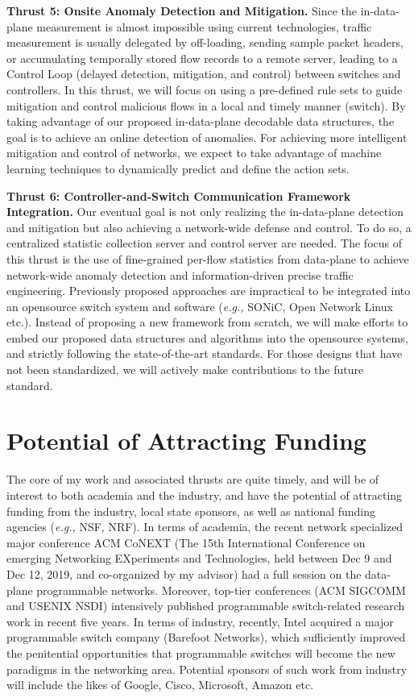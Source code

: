 \documentclass{NSF}
\newcommand{\BfPara}[1]{{\noindent\textbf{#1.}}\xspace}
\newcommand{\etc}{{etc.}\xspace}
\newcommand{\eg}{{\em e.g.,}\xspace}
\begin{document}
\BfPara{Thrust 5: Onsite Anomaly Detection and Mitigation}
Since the in-data-plane measurement is almost impossible using current technologies, traffic measurement is usually delegated by off-loading, sending sample packet headers, or accumulating temporally stored flow records to a remote server, leading to a Control Loop (delayed detection, mitigation, and control) between switches and controllers. In this thrust, we will focus on using a pre-defined rule sets to guide mitigation and control malicious flows in a local and timely manner (switch). By taking advantage of our proposed in-data-plane decodable data structures, the goal is to achieve an online detection of anomalies. For achieving more intelligent mitigation and control of networks, we expect to take advantage of machine learning techniques to dynamically predict and define the action sets.

\BfPara{Thrust 6: Controller-and-Switch Communication Framework Integration}
Our eventual goal is not only realizing the in-data-plane detection and mitigation but also achieving a network-wide defense and control. To do so, a centralized statistic collection server and control server are needed. The focus of this thrust is the use of fine-grained per-flow statistics from data-plane to achieve network-wide anomaly detection and information-driven precise traffic engineering. Previously proposed approaches are impractical to be integrated into an opensource switch system and software (\eg SONiC, Open Network Linux \etc). Instead of proposing a new framework from scratch, we will make efforts to embed our proposed data structures and algorithms into the opensource systems, and strictly following the state-of-the-art standards. For those designs that have not been standardized, we will actively make contributions to the future standard. 

\section{Potential of Attracting Funding}\vspace{-1mm}
The core of my work and associated thrusts are quite timely, and will be of interest to both academia and the industry, and have the potential of attracting funding from the industry, local state sponsors, as well as national funding agencies (\eg NSF, NRF). In terms of academia, the recent network specialized major conference ACM CoNEXT (The 15th International Conference on emerging Networking EXperiments and Technologies, held between Dec 9 and Dec 12, 2019, and co-organized by my advisor) had a full session on the data-plane programmable networks. Moreover, top-tier conferences (ACM SIGCOMM and USENIX NSDI) intensively published programmable switch-related research work in recent five years. In terms of industry, recently, Intel acquired a major programmable switch company (Barefoot Networks), which sufficiently improved the penitential opportunities that programmable switches will become the new paradigms in the networking area. Potential sponsors of such work from industry will include the likes of Google, Cisco, Microsoft, Amazon \etc  
\end{document}
